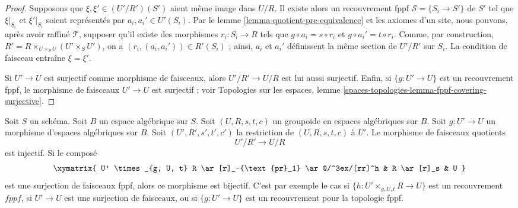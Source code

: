 \begin{proof}
Supposons que $\xi, \xi' \in (U'/R')(S')$ aient même image dans $U/R$. Il existe alors un recouvrement fppf $\mathcal{S} = \{S_i \to S'\}$ de $S'$ tel que $\xi|_{S_i}$ et $\xi'|_{S_i}$ soient représentés par $a_i, a_i' \in U'(S_i)$. Par le lemme \ref{lemma-quotient-pre-equivalence} et les axiomes d'un site, nous pouvons, après avoir raffiné $\mathcal{T}$, supposer qu'il existe des morphismes $r_i : S_i \to R$ tels que $g \circ a_i = s \circ r_i$ et $g \circ a_i' = t \circ r_i$. Comme, par construction, $R' = R \times_{U \times_S U} (U' \times_S U')$, on a $(r_i, (a_i, a_i')) \in R'(S_i)$ ; ainsi, $a_i$ et $a_i'$ définissent la même section de $U'/R'$ sur $S_i$. La condition de faisceau entraîne $\xi = \xi'$.

\medskip\noindent
Si $U' \to U$ est surjectif comme morphisme de faisceaux, alors $U'/R' \to U/R$ est lui aussi surjectif. Enfin, si $\{g : U' \to U\}$ est un recouvrement fppf, le morphisme de faisceaux $U' \to U$ est surjectif ; voir Topologies sur les espaces, lemme \ref{spaces-topologies-lemma-fppf-covering-surjective}.
\end{proof}

\begin{lemma}
\label{lemma-quotient-groupoid-restrict}
Soit $S$ un schéma. Soit $B$ un espace algébrique sur $S$. Soit $(U, R, s, t, c)$ un groupoïde en espaces algébriques sur $B$. Soit $g : U' \to U$ un morphisme d'espaces algébriques sur $B$. Soit $(U', R', s', t', c')$ la restriction de $(U, R, s, t, c)$ à $U'$. Le morphisme de faisceaux quotients
$$
U'/R' \longrightarrow U/R
$$
est injectif. Si le composé
$$
\xymatrix{
U' \times_{g, U, t} R \ar[r]_-{\text{pr}_1} \ar@/^3ex/[rr]^h
& R \ar[r]_s & U
}
$$
est une surjection de faisceaux fppf, alors ce morphisme est bijectif. C'est par exemple le cas si $\{h : U' \times_{g, U, t} R \to U\}$ est un recouvrement $fppf$, si $U' \to U$ est une surjection de faisceaux, ou si $\{g : U' \to U\}$ est un recouvrement pour la topologie fppf.
\end{lemma}

